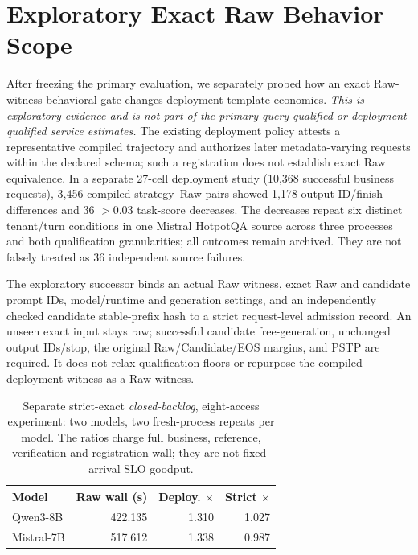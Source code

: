 \section{Exploratory Exact Raw Behavior Scope}
\label{sec:s-strict-exploration}
After freezing the primary evaluation, we separately probed how an exact Raw-witness behavioral gate changes deployment-template economics. \emph{This is exploratory evidence and is not part of the primary query-qualified or deployment-qualified service estimates.} The existing deployment policy attests a representative compiled trajectory and authorizes later metadata-varying requests within the declared schema; such a registration does not establish exact Raw equivalence. In a separate 27-cell deployment study (10,368 successful business requests), 3,456 compiled strategy--Raw pairs showed 1,178 output-ID/finish differences and 36 $>0.03$ task-score decreases. The decreases repeat six distinct tenant/turn conditions in one Mistral HotpotQA source across three processes and both qualification granularities; all outcomes remain archived. They are not falsely treated as 36 independent source failures.

The exploratory successor binds an actual Raw witness, exact Raw and candidate prompt IDs, model/runtime and generation settings, and an independently checked candidate stable-prefix hash to a strict request-level admission record. An unseen exact input stays raw; successful candidate free-generation, unchanged output IDs/stop, the original Raw/Candidate/EOS margins, and PSTP are required. It does not relax qualification floors or repurpose the compiled deployment witness as a Raw witness.

\begin{table}[t]
\centering\footnotesize
\setlength{\tabcolsep}{3pt}
\caption{Separate strict-exact \emph{closed-backlog}, eight-access experiment: two models, two fresh-process repeats per model. The ratios charge full business, reference, verification and registration wall; they are not fixed-arrival SLO goodput.}
\label{tab:s-strict-exploration}
\begin{tabular}{@{}lrrr@{}}
\toprule
Model & Raw wall (s) & Deploy. $\times$ & Strict $\times$\\
\midrule
Qwen3-8B & 422.135 & 1.310 & 1.027\\
Mistral-7B & 517.612 & 1.338 & 0.987\\
\bottomrule
\end{tabular}
\end{table}

